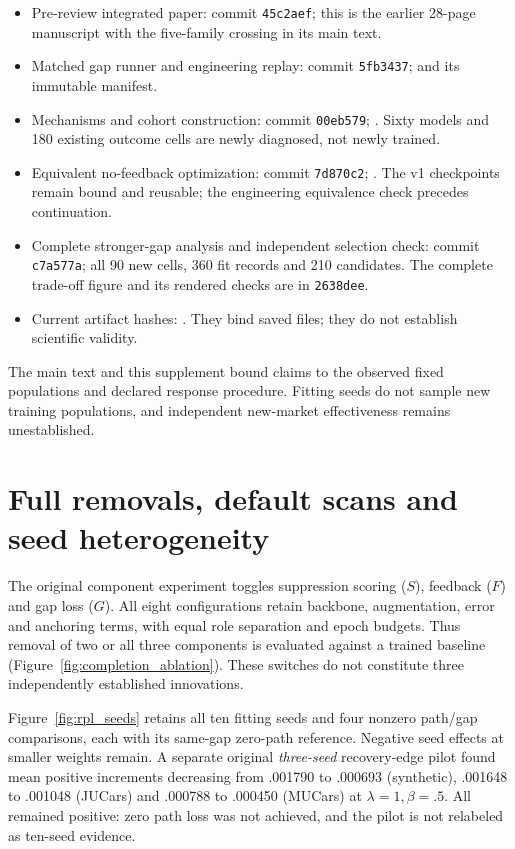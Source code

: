 \documentclass[11pt]{article}
\begin{document}
\begin{itemize}
\item Pre-review integrated paper: commit \texttt{45c2aef}; this is the earlier
28-page manuscript with the five-family crossing in its main text.
\item Matched gap runner and engineering replay: commit \texttt{5fb3437};
 and its immutable manifest.
\item Mechanisms and cohort construction: commit \texttt{00eb579};
. Sixty models and 180 existing outcome
cells are newly diagnosed, not newly trained.
\item Equivalent no-feedback optimization: commit \texttt{7d870c2};
. The v1 checkpoints remain
bound and reusable; the engineering equivalence check precedes continuation.
\item Complete stronger-gap analysis and independent selection check:
commit \texttt{c7a577a}; all 90 new cells, 360 fit records and 210 candidates.
The complete trade-off figure and its rendered checks are in \texttt{2638dee}.
\item Current artifact hashes: .
They bind saved files; they do not establish scientific validity.
\end{itemize}
The main text and this supplement bound claims to the observed fixed
populations and declared response procedure. Fitting seeds do not sample
new training populations, and independent new-market effectiveness remains
unestablished.
\section{Full removals, default scans and seed heterogeneity}\label{app:extended}
The original component experiment toggles suppression scoring ($S$), feedback
($F$) and gap loss ($G$). All eight configurations retain backbone,
augmentation, error and anchoring terms, with equal role separation and epoch
budgets. Thus removal of two or all three components is evaluated against a
trained baseline (Figure~\ref{fig:completion_ablation}). These switches do
not constitute three independently established innovations.

Figure~\ref{fig:rpl_seeds} retains all ten fitting seeds and four nonzero
path/gap comparisons, each with its same-gap zero-path reference. Negative
seed effects at smaller weights remain. A separate original \emph{three-seed}
recovery-edge pilot found mean positive increments decreasing from .001790
to .000693 (synthetic), .001648 to .001048 (JUCars) and .000788 to .000450
(MUCars) at $\lambda=1,\beta=.5$. All remained positive: zero path loss was
not achieved, and the pilot is not relabeled as ten-seed evidence.
\end{document}
